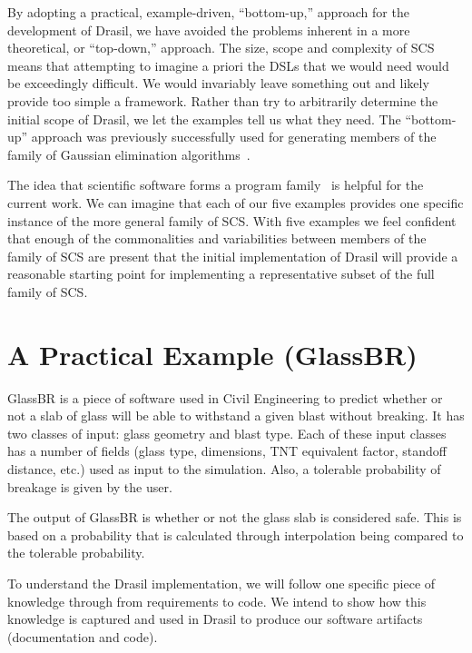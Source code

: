 \documentclass[sigconf]{acmart}
\begin{document}
By adopting a practical, example-driven, ``bottom-up,'' approach for the
development of Drasil, we have avoided the problems inherent in a more
theoretical, or ``top-down,'' approach.  The size, scope and complexity of SCS
means that attempting to imagine a priori the DSLs that we would need would be
exceedingly difficult.  We would invariably leave something out and likely
provide too simple a framework.  Rather than try to arbitrarily determine the
initial scope of Drasil, we let the examples tell us what they need. The
``bottom-up'' approach was previously successfully used for generating members
of the family of Gaussian elimination algorithms~\cite{Carette2006}.  

The idea that scientific software forms a program
family~\cite{SmithMcCutchanAndCao2007} is helpful for the current work.  We can
imagine that each of our five examples provides one specific instance of the
more general family of SCS.  With five examples we feel confident that enough of
the commonalities and variabilities between members of the family of SCS are
present that the initial implementation of Drasil will provide a reasonable
starting point for implementing a representative subset of the full family of
SCS.

\section{A Practical Example (GlassBR)} \label{SecGlassBR}

GlassBR is a piece of software used in Civil Engineering to predict whether or 
not a slab of glass will be able to withstand a given blast without breaking. It
has two classes of input: glass geometry and blast type. Each of these input 
classes has a number of fields (glass type, dimensions, TNT equivalent factor, 
standoff distance, etc.) used as input to the simulation. Also, a tolerable 
probability of breakage is given by the user.

The output of GlassBR is whether or not the glass slab is considered safe. This 
is based on a probability that is calculated through interpolation being 
compared to the tolerable probability.

To understand the Drasil implementation, we will follow one specific piece of 
knowledge through from requirements to code. We intend to show how this 
knowledge is captured and used in Drasil to produce our software artifacts 
(documentation and code).


\end{document}
